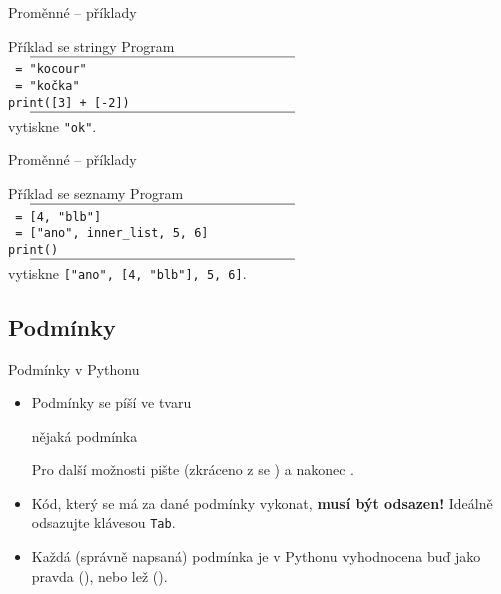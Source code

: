 \begin{frame}{Proměnné -- příklady}
 \begin{block}{Příklad se stringy}
  \vspace{6pt}
  Program\\
  $\vcenter{\rule{.55\textwidth}{0.4pt}}$\\
  \texttt{ = "kocour"}\\
  \texttt{ = "kočka"}\\
  \texttt{print([3] + [-2])}\\
  $\vcenter{\rule{.55\textwidth}{0.4pt}}$\\
  vytiskne \texttt{"ok"}.
 \end{block}
\end{frame}

\begin{frame}{Proměnné -- příklady}
 \begin{block}{Příklad se seznamy}
  \vspace{6pt}
  Program\\
  $\vcenter{\rule{.55\textwidth}{0.4pt}}$\\
  \texttt{ = [4, "blb"]}\\
  \texttt{ = ["ano", inner_list, 5, 6]}\\
  \texttt{print()}\\
  $\vcenter{\rule{.55\textwidth}{0.4pt}}$\\
  vytiskne \texttt{["ano", [4, "blb"], 5, 6]}.
 \end{block}
\end{frame}

\subsection[Podmínky]{Podmínky}

\begin{frame}{Podmínky v Pythonu}
 \begin{itemize}
  \item<1-> Podmínky se píší ve tvaru
   \begin{center}
    \texttt{} nějaká
    podmínka\texttt{\mlb{:}}
   \end{center}
   Pro další možnosti pište \texttt{} (zkráceno z se )
   a nakonec \texttt{}.
  \item<2-> Kód, který se má za dané podmínky vykonat, \textbf{musí být
   odsazen!} Ideálně odsazujte klávesou \texttt{Tab}.
  \item<3-> Každá (správně napsaná) podmínka je v Pythonu vyhodnocena buď jako
   pravda (\texttt{}), nebo lež (\texttt{}).
 \end{itemize}
\end{frame}

